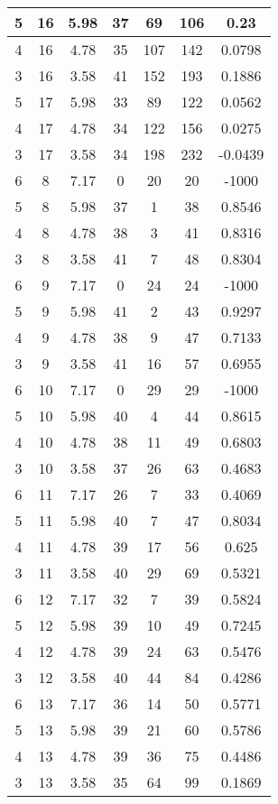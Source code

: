 \documentclass[letterpaper, 12pt]{article}
\begin{document}
\begin{longtable}{|c|c|c|c|c|c|c|}
\hline
5 & 16 & 5.98 & 37 & 69 & 106 & 0.23 \\
\hline
4 & 16 & 4.78 & 35 & 107 & 142 & 0.0798 \\
\hline
3 & 16 & 3.58 & 41 & 152 & 193 & 0.1886 \\
\hline
5 & 17 & 5.98 & 33 & 89 & 122 & 0.0562 \\
\hline
4 & 17 & 4.78 & 34 & 122 & 156 & 0.0275 \\
\hline
3 & 17 & 3.58 & 34 & 198 & 232 & -0.0439 \\
\hline
6 & 8 & 7.17 & 0 & 20 & 20 & -1000 \\
\hline
5 & 8 & 5.98 & 37 & 1 & 38 & 0.8546 \\
\hline
4 & 8 & 4.78 & 38 & 3 & 41 & 0.8316 \\
\hline
3 & 8 & 3.58 & 41 & 7 & 48 & 0.8304 \\
\hline
6 & 9 & 7.17 & 0 & 24 & 24 & -1000 \\
\hline
5 & 9 & 5.98 & 41 & 2 & 43 & 0.9297 \\
\hline
4 & 9 & 4.78 & 38 & 9 & 47 & 0.7133 \\
\hline
3 & 9 & 3.58 & 41 & 16 & 57 & 0.6955 \\
\hline
6 & 10 & 7.17 & 0 & 29 & 29 & -1000 \\
\hline
5 & 10 & 5.98 & 40 & 4 & 44 & 0.8615 \\
\hline
4 & 10 & 4.78 & 38 & 11 & 49 & 0.6803 \\
\hline
3 & 10 & 3.58 & 37 & 26 & 63 & 0.4683 \\
\hline
6 & 11 & 7.17 & 26 & 7 & 33 & 0.4069 \\
\hline
5 & 11 & 5.98 & 40 & 7 & 47 & 0.8034 \\
\hline
4 & 11 & 4.78 & 39 & 17 & 56 & 0.625 \\
\hline
3 & 11 & 3.58 & 40 & 29 & 69 & 0.5321 \\
\hline
6 & 12 & 7.17 & 32 & 7 & 39 & 0.5824 \\
\hline
5 & 12 & 5.98 & 39 & 10 & 49 & 0.7245 \\
\hline
4 & 12 & 4.78 & 39 & 24 & 63 & 0.5476 \\
\hline
3 & 12 & 3.58 & 40 & 44 & 84 & 0.4286 \\
\hline
6 & 13 & 7.17 & 36 & 14 & 50 & 0.5771 \\
\hline
5 & 13 & 5.98 & 39 & 21 & 60 & 0.5786 \\
\hline
4 & 13 & 4.78 & 39 & 36 & 75 & 0.4486 \\
\hline
3 & 13 & 3.58 & 35 & 64 & 99 & 0.1869 \\

\end{longtable}
\end{document}
